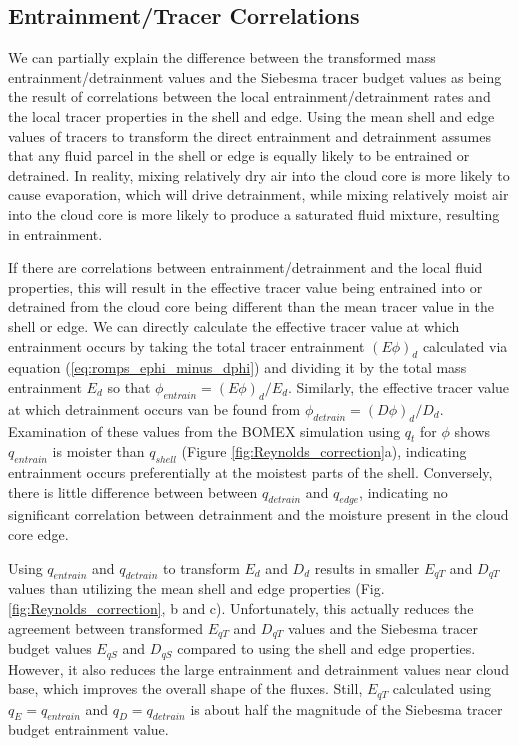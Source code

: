\documentclass[12pt]{article}
\begin{document}

\subsection{Entrainment/Tracer Correlations}

We can partially explain the difference between the transformed mass 
entrainment/detrainment values and the Siebesma tracer budget values as 
being the result of correlations between the local entrainment/detrainment 
rates and the local tracer properties in the shell and edge.  Using the 
mean shell and edge values of tracers to transform the direct entrainment 
and detrainment assumes that any fluid parcel in the shell or edge is 
equally likely to be entrained or detrained.  In reality, mixing relatively 
dry air into the cloud core is more likely to cause evaporation, which will 
drive detrainment, while mixing relatively moist air into the cloud core is 
more likely to produce a saturated fluid mixture, resulting in entrainment.

If there are correlations between entrainment/detrainment and the local 
fluid properties, this will result in the effective tracer value being 
entrained into or detrained from the cloud core being different than the 
mean tracer value in the shell or edge.  We can directly calculate the 
effective tracer value at which entrainment occurs by taking the total 
tracer entrainment $(E\phi)_d$ calculated via equation 
(\ref{eq:romps_ephi_minus_dphi}) and dividing it by the total mass
entrainment $E_d$ so that $\phi_{entrain} = (E\phi)_d / E_d$.  Similarly, 
the effective tracer value at which detrainment occurs van be found from  
$\phi_{detrain} = (D\phi)_d / D_d$.  Examination of these values from the 
BOMEX simulation using $q_t$ for $\phi$ shows $q_{entrain}$ is moister than 
$q_{shell}$ (Figure \ref{fig:Reynolds_correction}a), indicating entrainment
occurs preferentially at the moistest parts of the shell.  Conversely, 
there is little difference between between $q_{detrain}$ and $q_{edge}$,
indicating no significant correlation between detrainment and the moisture
present in the cloud core edge.

Using $q_{entrain}$ and $q_{detrain}$ to transform $E_d$ and $D_d$ results 
in smaller $E_{q T}$ and $D_{q T}$ values than utilizing the mean shell and 
edge properties (Fig. \ref{fig:Reynolds_correction}, b and c).  
Unfortunately, this actually reduces the agreement between transformed 
$E_{q T}$ and $D_{q T}$ values and the Siebesma tracer budget values 
$E_{q S}$ and $D_{q S}$ compared to using the shell and edge properties.
 However, it also reduces the large entrainment and detrainment values near 
cloud base, which improves the overall shape of the fluxes.  Still, 
$E_{q T}$ calculated using $q_E = q_{entrain}$ and $q_D = q_{detrain}$ is 
about half the magnitude of the Siebesma tracer budget entrainment value.
\end{document}

